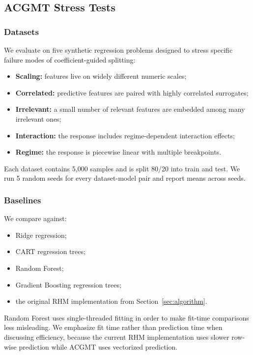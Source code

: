 \documentclass[11pt,a4paper]{article}
\begin{document}
\subsection{ACGMT Stress Tests}

\subsubsection{Datasets}

We evaluate on five synthetic regression problems designed to stress specific failure modes of coefficient-guided splitting:
\begin{itemize}
    \item \textbf{Scaling:} features live on widely different numeric scales;
    \item \textbf{Correlated:} predictive features are paired with highly correlated surrogates;
    \item \textbf{Irrelevant:} a small number of relevant features are embedded among many irrelevant ones;
    \item \textbf{Interaction:} the response includes regime-dependent interaction effects;
    \item \textbf{Regime:} the response is piecewise linear with multiple breakpoints.
\end{itemize}
Each dataset contains 5{,}000 samples and is split 80/20 into train and test. We run 5 random seeds for every dataset-model pair and report means across seeds.

\subsubsection{Baselines}

We compare against:
\begin{itemize}
    \item Ridge regression;
    \item CART regression trees;
    \item Random Forest;
    \item Gradient Boosting regression trees;
    \item the original RHM implementation from Section~\ref{sec:algorithm}.
\end{itemize}
Random Forest uses single-threaded fitting in order to make fit-time comparisons less misleading. We emphasize fit time rather than prediction time when discussing efficiency, because the current RHM implementation uses slower row-wise prediction while ACGMT uses vectorized prediction.
\end{document}
